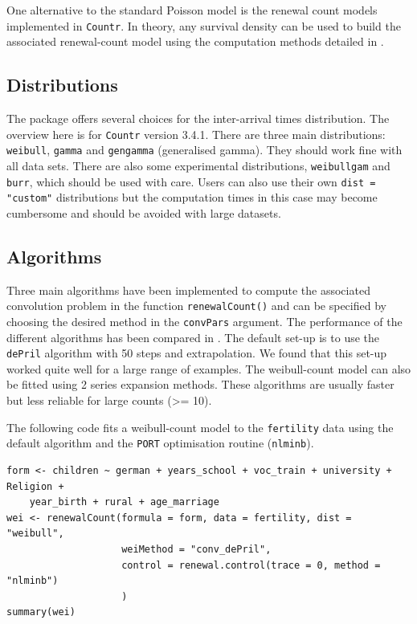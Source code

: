\documentclass[a4paper,twoside,11pt]{article}
\newcommand{\code}{\texttt}
\begin{document}
One alternative to the standard Poisson model is the renewal count models
implemented in \texttt{Countr}. In theory, any survival density can be used to build
the associated renewal-count model using the computation methods detailed in
\citet{baker2017event}.


\subsection{Distributions}
\label{sec:orga269afd}

The package offers several choices for the inter-arrival times distribution.
The overview here is for \texttt{Countr} version 3.4.1.
There are three main distributions:
\code{weibull}, \code{gamma} and \code{gengamma} (generalised gamma). They
should work fine with all data sets. There are also some experimental
distributions, \code{weibullgam} 
\citep[weibull-gamma, see][Section 3.2]{mcshane2008count} and \code{burr}, 
which should be used with care. Users can also use their own \texttt{dist = "custom"}
distributions but the computation times in this case may become cumbersome and
should be avoided with large datasets.


\subsection{Algorithms}
\label{sec:org2b8bfc7}

Three main algorithms have been implemented to compute the associated
convolution problem in the function \texttt{renewalCount()} and can be specified by
choosing the desired method in the \texttt{convPars} argument. The performance of the
different algorithms has been compared in \citet[Section 7.2]{baker2017event}.
The default set-up is to use the \texttt{dePril} algorithm with 50 steps and
extrapolation. We found that this set-up worked quite well for a large range of
examples. The weibull-count model can also be fitted using 2 series expansion
methods. These algorithms are usually faster but less reliable for large counts
(>= 10).

The following code fits a weibull-count model to the \texttt{fertility} data using the
default algorithm and the \texttt{PORT} optimisation routine (\code{nlminb}).

\begin{verbatim}
form <- children ~ german + years_school + voc_train + university + Religion +
    year_birth + rural + age_marriage
wei <- renewalCount(formula = form, data = fertility, dist = "weibull",
                    weiMethod = "conv_dePril",
                    control = renewal.control(trace = 0, method = "nlminb")
                    )
summary(wei)
\end{verbatim}
\end{document}
